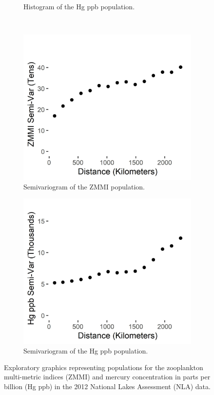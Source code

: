 \documentclass[]{elsarticle} %
\begin{document}
\begin{figure}
\begin{subfigure}{0.49\textwidth}
  \caption{Histogram of the Hg ppb population.}
  \label{fig:mercury_hist}
\end{subfigure} \\
\begin{subfigure}{0.49\textwidth}
  \centering
  \includegraphics[width = 1\linewidth]{figures/zmmi_sv.jpeg}
  \caption{Semivariogram of the ZMMI population.}
  \label{fig:zmmi_sv_plot}
\end{subfigure}
\begin{subfigure}{0.49\textwidth}
  \centering
  \includegraphics[width = 1\linewidth]{figures/mercury_sv.jpeg}
  \caption{Semivariogram of the Hg ppb population.}
  \label{fig:mercury_sv_plot}
\end{subfigure}
\caption{Exploratory graphics representing populations for the zooplankton multi-metric indices (ZMMI) and mercury concentration in parts per billion (Hg ppb) in the 2012 National Lakes Assessment (NLA) data.}
\label{fig:zmmi}
\end{figure}
\end{document}
